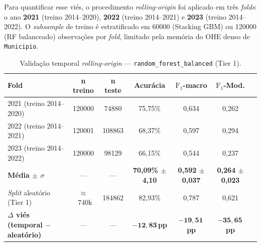 Para quantificar esse viés, o procedimento \emph{rolling-origin} foi aplicado em três \emph{folds}: o ano \textbf{2021} (treino 2014--2020), \textbf{2022} (treino 2014--2021) e \textbf{2023} (treino 2014--2022). O \emph{subsample} de treino é estratificado em \num{60000} (Stacking GBM) ou \num{120000} (RF balanceado) observações por \emph{fold}, limitado pela memória do OHE denso de \texttt{Municipio}.

\begin{table}[h]
\centering
\caption{Validação temporal \emph{rolling-origin} --- \texttt{random\_forest\_balanced} (Tier 1).}
\label{tab:res_temporal_rf}
\small
\begin{tabular}{lcccccc}
\toprule
\textbf{Fold} & \textbf{n treino} & \textbf{n teste} & \textbf{Acurácia} & \textbf{$\text{F}_1$-macro} & \textbf{$\text{F}_1$-Mod.} \\
\midrule
2021 (treino 2014--2020) & \num{120000}  & \num{74880}  & 75,75\% & 0,634 & 0,262 \\
2022 (treino 2014--2021) & \num{120001}  & \num{108863} & 68,37\% & 0,597 & 0,294 \\
2023 (treino 2014--2022) & \num{120000}  & \num{98129}  & 66,15\% & 0,544 & 0,237 \\
\textbf{Média $\pm$ $\sigma$} & --- & --- & \textbf{70,09\% $\pm$ 4,10} & \textbf{0,592 $\pm$ 0,037} & \textbf{0,264 $\pm$ 0,023} \\
\midrule
\emph{Split} aleatório (Tier 1) & $\approx$~740k & \num{184862} & 82,93\% & 0,787 & 0,621 \\
\textbf{$\Delta$ viés (temporal $-$ aleatório)} & --- & --- & $\boldsymbol{-12{,}83}$\,\textbf{pp} & $\boldsymbol{-19{,}51}$\,\textbf{pp} & $\boldsymbol{-35{,}65}$\,\textbf{pp} \\
\bottomrule
\end{tabular}
\end{table}

